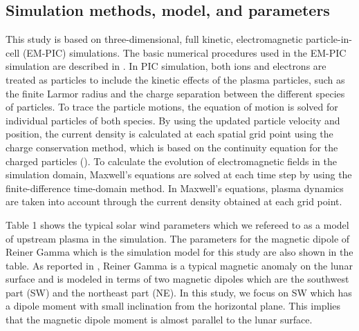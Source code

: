 \documentclass[draft,jgrga]{agutex2015}
\begin{document}
\begin{article}
\section{Simulation methods, model, and parameters}
This study is based on three-dimensional, full kinetic,
electromagnetic particle-in-cell (EM-PIC) simulations.
The basic numerical procedures used in the EM-PIC simulation are 
described in \cite{Birdsall1991}.  
In PIC simulation, 
both ions and electrons are treated as particles to 
include the kinetic effects of the plasma particles, 
such as the finite Larmor radius and the charge separation 
between the different species of particles. 
To trace the particle motions, 
the equation of motion is solved for individual particles of both species.
By using the updated particle velocity and position, 
the current density is calculated at each spatial grid point using the charge conservation method, 
which is based on the continuity equation for the charged particles (\cite{Villasenor1992}).
To calculate the evolution of electromagnetic fields in the simulation domain,
Maxwell's equations are solved at each time step
by using the finite-difference time-domain method.
In Maxwell's equations, plasma dynamics are taken into account through
the current density obtained at each grid point.

Table 1 shows the typical solar wind parameters
which we refereed to as a model of upstream plasma in the simulation.
The parameters for the magnetic dipole of Reiner Gamma 
which is the simulation model for this study are also shown in the table. 
As reported in \cite{kurata2005}, 
Reiner Gamma is a typical magnetic anomaly on the lunar surface
and is modeled in terms of two magnetic dipoles
which are the southwest part (SW) and the northeast part (NE).
In this study, 
we focus on SW which has a dipole moment with
small inclination from the horizontal plane.
This implies that 
the magnetic dipole moment is almost parallel to the lunar surface. 




\end{article}
\end{document}
